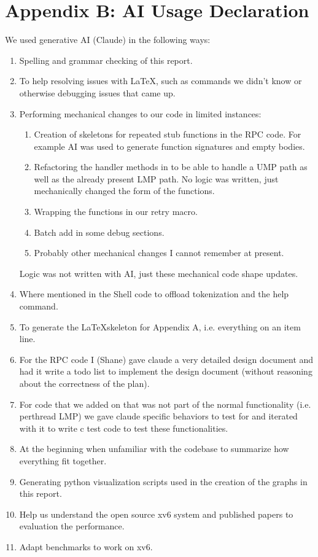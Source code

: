 \chapter*{Appendix B: AI Usage Declaration}{}

We used generative AI (Claude) in the following ways:
\begin{enumerate}
  \item Spelling and grammar checking of this report.
  \item To help resolving issues with \LaTeX, such as commands we didn't know
  or otherwise debugging issues that came up.
  \item Performing mechanical changes to our code in limited instances:
  \begin{enumerate}
    \item Creation of skeletons for repeated stub functions in the RPC code. For example
    AI was used to generate  function signatures and empty bodies.
    \item Refactoring the handler methods in  to be able to handle a UMP path
    as well as the already present LMP path. No logic was written, just mechanically changed the form of the functions.
    \item Wrapping the  functions in our retry macro.
    \item Batch add  in some debug sections.
    \item Probably other mechanical changes I cannot remember at present.
  \end{enumerate}
  Logic was not written with AI, just these mechanical code shape updates.
  \item Where mentioned in the Shell code to offload tokenization and the help command.
  \item To generate the \LaTeX  skeleton for Appendix A, i.e. everything on an item line.
  \item For the RPC code I (Shane) gave claude a very detailed design document and had it write
  a todo list to implement the design document (without reasoning about the correctness of the plan).
  \item For code that we added on that was not part of the normal functionality (i.e. perthread LMP) we gave claude specific behaviors
  to test for and iterated with it to write c test code to test these functionalities.
  \item At the beginning when unfamiliar with the codebase to summarize how everything fit together.
  \item Generating python visualization scripts used in the creation of the graphs in this report.
  \item Help us understand the open source xv6 system and published papers to evaluation the performance.
  \item Adapt benchmarks to work on xv6.
\end{enumerate}

